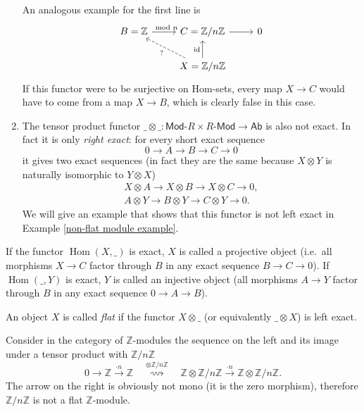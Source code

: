\documentclass[english,letterpaper]{article}%
\numberwithin{equation}{section}
\numberwithin{figure}{section}
\numberwithin{table}{section}
\theoremstyle{definition}
\theoremstyle{definition}
\theoremstyle{definition}
\theoremstyle{plain}
\theoremstyle{plain}
\theoremstyle{plain}
\theoremstyle{plain}
\theoremstyle{remark}
\theoremstyle{remark}
\DeclareMathOperator{\id}{id}
\DeclareMathOperator{\Hom}{Hom}
\begin{document}
\begin{example}
\begin{enumerate}
        An analogous example for the first line is
        \[\begin{tikzcd}
        B=\mathbb{Z}\arrow[r,"\mod n"] & C=\mathbb{Z}/n\mathbb{Z}\arrow[r] & 0 \\
         &X=\mathbb{Z}/n\mathbb{Z}\arrow[ul,dashed,"?"]\arrow[u,
        "\id"] &
        \end{tikzcd}\]
        If this functor were to be surjective on Hom-sets, every map $X\to C$ would have to come from a map $X\to B$, which is clearly false in this case.
        \item The tensor product functor $\_\otimes\_:\mathsf{Mod}\text{-}R\times R\text{-}\mathsf{Mod}\to \mathsf{Ab}$ is also not exact. In fact it is only \emph{right exact}: for every short exact sequence
        \[0\to A\to B\to C\to 0\]
        it gives two exact sequences (in fact they are the same because $X\otimes Y$ is naturally isomorphic to $Y\otimes X$)
        \begin{eqnarray} 
        X\otimes A\to X\otimes B\to X\otimes C\to 0,\\
        A\otimes Y\to B\otimes Y\to C\otimes Y\to 0.
        \end{eqnarray}
        We will give an example that shows that this functor is not left exact in Example \ref{non-flat module example}.
    \end{enumerate}
\end{example}

\begin{defn}
    If the functor $\Hom(X,\_)$ is exact, $X$ is called a projective object (i.e.\ all morphisms $X\to C$ factor through $B$ in any exact sequence $B\to C\to 0$). If $\Hom(\_,Y)$ is exact, $Y$ is called an injective object (all morphisms $A\to Y$ factor through $B$ in any exact sequence $0\to A\to B$).
\end{defn}

\begin{defn}
    An object $X$ is called \emph{flat} if the functor $X\otimes\_$ (or equivalently $\_\otimes X$) is left exact.
\end{defn}

\begin{example}\label{non-flat module example}
    Consider in the category of $\mathbb{Z}$-modules the sequence on the left and its image under a tensor product with $\mathbb{Z}/n\mathbb{Z}$
    \[0\to \mathbb{Z}\overset{\cdot n}\to \mathbb{Z} \quad \overset{\otimes\mathbb{Z}/n\mathbb{Z}}\rightsquigarrow \quad \mathbb{Z}\otimes \mathbb{Z}/n\mathbb{Z}\overset{\cdot n}\to\mathbb{Z}\otimes \mathbb{Z}/n\mathbb{Z}.\]
    The arrow on the right is obviously not mono (it is the zero morphism), therefore $\mathbb{Z}/n\mathbb{Z}$ is not a flat $\mathbb{Z}$-module.
\end{example}
\end{document}
